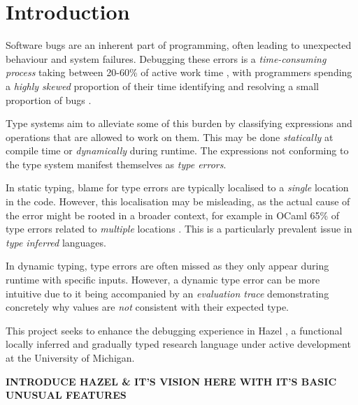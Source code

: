 \chapter{Introduction}
\label{chap:Introduction}
Software bugs are an inherent part of programming, often leading to unexpected behaviour and system failures. Debugging these errors is a \textit{time-consuming process} taking between 20-60\% of active work time \cite{DebugTimeSelfReport}, with programmers spending a \textit{highly skewed} proportion of their time identifying and resolving a small proportion of bugs \cite{DebugSkew}.

Type systems aim to alleviate some of this burden by classifying expressions and operations that are allowed to work on them. This may be done \textit{statically} at compile time or \textit{dynamically} during runtime. The expressions not conforming to the type system manifest themselves as \textit{type errors}.

In static typing, blame for type errors are typically localised to a \textit{single} location in the code. However, this localisation may be misleading, as the actual cause of the error might be rooted in a broader context, for example in OCaml 65\% of type errors related to \textit{multiple} locations \cite{StudentTypeErrorFixes}. This is a particularly prevalent issue in \textit{type inferred} languages.

In dynamic typing, type errors are often missed as they only appear during runtime with specific inputs. However, a dynamic type error can be more intuitive due to it being accompanied by an \textit{evaluation trace} demonstrating concretely why values are \textit{not} consistent with their expected type.

This project seeks to enhance the debugging experience in Hazel \cite{Hazel}, a functional locally inferred and gradually typed research language under active development at the University of Michigan. 

\textbf{INTRODUCE HAZEL \& IT'S VISION HERE WITH IT'S BASIC UNUSUAL FEATURES}

